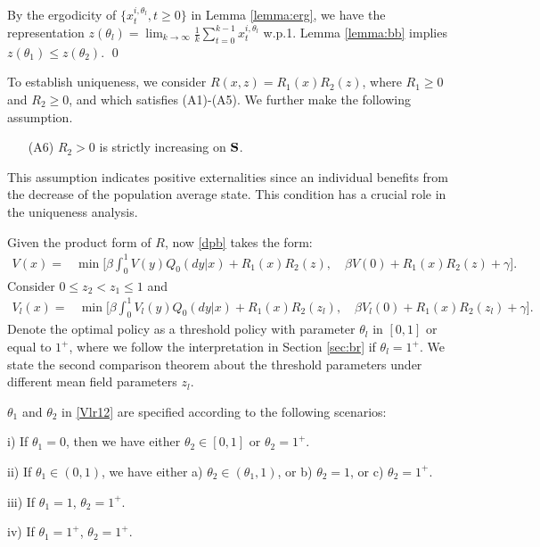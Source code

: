 \documentclass[graybox]{svmult}
\def\bS{{\bf S}}
\begin{document}
\proof
By the ergodicity of $\{x_t^{i,\theta_l}, t\ge 0\}$ in Lemma \ref{lemma:erg}, we have the representation
$
z(\theta_l)= \lim_{k\to \infty }  \frac{1}{k}
\sum_{t=0}^{k-1}x_t^{i, \theta_l}
$ w.p.1. Lemma
\ref{lemma:bb} implies
$z(\theta_1)\le z(\theta_2).$ \qed


To establish uniqueness, we consider
$ R(x, z)=R_1(x)R_2(z)$, where $R_1\ge 0$ and $R_2\ge 0$, and which satisfies (A1)-(A5). We further make the following assumption.


\begin{itemize}

\item[(A6)]\qquad  $R_2>0$ is strictly increasing on $\bS$.
\end{itemize}

This assumption indicates positive externalities since an individual  benefits from  the decrease of the population average state. This condition has a crucial role in the uniqueness analysis.


Given the product form of $R$, now \eqref{dpb} takes the form:
\begin{align*}
V(x) =  &\min \Big[\beta \int_0^1 V( y) Q_0(dy|x) + R_1(x)R_2(  z),
\quad \beta V(0) + R_1(x)R_2( z)+ \gamma\Big].
\end{align*}
Consider $0\le z_2<z_1\le 1$ and
\begin{align}
V_l(x) =  &\min \Big[\beta \int_0^1 V_l( y) Q_0(dy|x) + R_1(x)R_2(  z_l),  \quad \beta V_l(0) + R_1(x)R_2( z_l)+ \gamma\Big]. \label{Vlr12}
\end{align}
Denote the optimal policy as a threshold policy  with parameter $\theta_l$ in $[0, 1]$ or equal to $1^+$, where we follow the interpretation in Section \ref{sec:br}
if $\theta_l=1^+$.
We state the second comparison theorem about  the threshold parameters under different mean field parameters $z_l$.

\begin{theorem} \label{theorem:s1s2}
 $\theta_1$ and $\theta_2$ in \eqref{Vlr12} are
specified according to the following scenarios:

i) If $\theta_1=0$, then we have either $\theta_2\in [0, 1]$ or
$\theta_2=1^+$.

ii)   If $\theta_1\in (0,1)$, we have either  a)
$\theta_2\in (\theta_1, 1)$, or b) $\theta_2=1 $,
or c) $\theta_2= 1^+$.

iii) If $\theta_1=1$, $\theta_2=1^+$.

iv) If $\theta_1=1^+$, $\theta_2= 1^+$.
\end{theorem}
\end{document}
